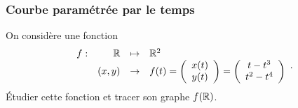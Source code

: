 \subsubsection{Courbe paramétrée par le temps}

On considère une fonction 
$$
\begin{array}{rrcl}
  f : & \mathbb{R} & \mapsto & \mathbb{R}^2 \\
  & (x, y) & \to & f(t) 
  = \left(\begin{array}{c} x(t) \\ y(t) \end{array}\right)
  = \left(\begin{array}{c} t - t^3 \\ t^2 - t^4 \end{array}\right)
\end{array}.
$$
\'Etudier cette fonction et tracer son graphe $f(\mathbb{R})$.
